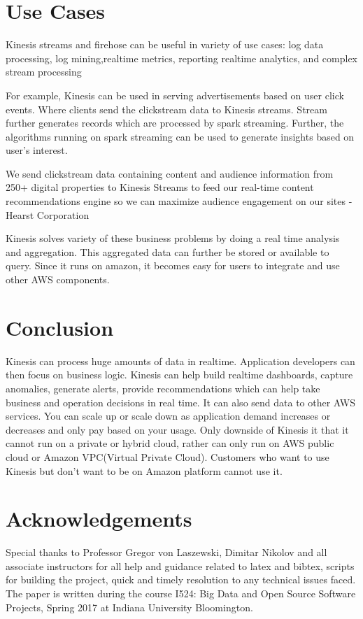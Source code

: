 \documentclass[9pt,twocolumn,twoside]{../../styles/osajnl}
\begin{document}
\section{Use Cases}
Kinesis streams \cite{www-kinesis} and firehose can be useful in variety of use
cases: log data processing, log mining,realtime metrics, reporting realtime analytics,
and complex stream processing

For example, Kinesis can be used in serving advertisements based on user click events. 
Where clients send the clickstream data to Kinesis streams. Stream further generates
records which are processed by spark streaming. Further, the algorithms running on 
spark streaming can be used to generate insights based on user's interest. 

\begin{displayquote}
We send clickstream data containing content and audience information from 
250+ digital properties to Kinesis Streams to feed our real-time content recommendations 
engine so we can maximize audience engagement on our sites - Hearst Corporation \cite{www-kinesis}
\end{displayquote}

Kinesis solves variety of these business problems by doing a real time analysis
and aggregation. This aggregated data can further be stored or available to
query. Since it runs on amazon, it becomes easy for users to integrate and use
other AWS components. 

\section{Conclusion}
Kinesis can process huge amounts of data in realtime. Application developers can
then focus on business logic. Kinesis can help build realtime dashboards, capture 
anomalies, generate alerts, provide recommendations which can help take business 
and operation decisions in real time. It can also send data to other AWS services. 
You can scale up or scale down as application  demand increases or decreases 
and only pay based on your usage. Only downside  of Kinesis it that it cannot run 
on a private or hybrid cloud, rather can only run on  AWS public cloud or 
Amazon VPC(Virtual Private Cloud)\cite{www-aws-vpc}.  Customers who want to use 
Kinesis but don't want to be on Amazon platform cannot use it.
\section*{Acknowledgements}
Special thanks to Professor Gregor von Laszewski, Dimitar Nikolov and all
associate instructors for all help and guidance related to latex and bibtex,
scripts for building the project, quick and timely resolution to any technical
issues faced. The paper is written during the course  {I524: Big Data and Open
Source Software Projects, Spring 2017} at Indiana University Bloomington.
 
\medskip

% 

\end{document}
